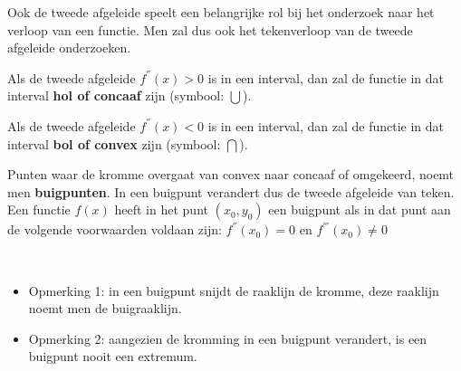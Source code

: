 Ook de tweede afgeleide speelt een belangrijke rol bij het
onderzoek naar het verloop van een functie. Men zal dus ook het tekenverloop
van de tweede afgeleide onderzoeken.


\begin{definitie}
	Als de tweede afgeleide $f^{''}(x)>0$ is in een interval,
dan zal de functie in dat interval \textbf{hol of concaaf} zijn (symbool:
$\bigcup$).

Als de tweede afgeleide $f^{''}(x)<0$ is in een interval,
dan zal de functie in dat interval \textbf{bol of convex} zijn (symbool:
$\bigcap$).

Punten waar de kromme overgaat van convex naar concaaf of
omgekeerd, noemt men \textbf{buigpunten}. In een buigpunt verandert
dus de tweede afgeleide van teken. Een functie $f(x)$ heeft in het
punt $(x_{0},y_{0})$ een buigpunt als in dat punt aan de volgende
voorwaarden voldaan zijn: $f^{''}(x_{0})=0$ en $f^{'''}(x_{0})\neq0$

\end{definitie}


\begin{opmerking}
	\ \\
	\begin{itemize}
	\item Opmerking 1: in een buigpunt snijdt de raaklijn de kromme,
	deze raaklijn noemt men de buigraaklijn.
	
	\item Opmerking 2: aangezien de kromming in een buigpunt verandert,
	is een buigpunt nooit een extremum.
\end{itemize}

\end{opmerking}


